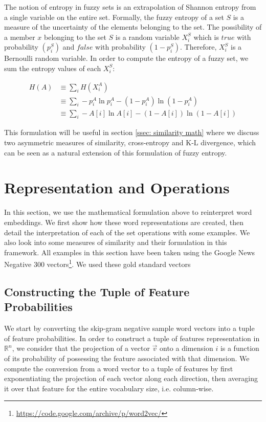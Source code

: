 \documentclass{book}
\begin{document}
The notion of entropy in fuzzy sets is an extrapolation of Shannon entropy from
a single variable on the entire set. Formally, the fuzzy entropy of a set $S$
is a measure of the uncertainty of the elements belonging to the set. The
possibility of a member $x$ belonging to the set $S$ is a random variable
$X_i^S$ which is $true$ with probability $(p_i^S)$ and $false$ with probability
$(1-p^S_i)$. Therefore, $X_i^S$ is a Bernoulli random variable. In order to
compute the entropy of a fuzzy set, we sum the entropy values of each $X_i^S$:

{\footnotesize \begin{align*} H(A) &\equiv \sum_i H(X^A_i) \\ &\equiv \sum_i
-p_i^A \ln p_i^A - (1 - p_i^A) \ln (1 - p_i^A) \\ &\equiv  \sum_i -A[i] \ln
A[i] - (1 - A[i]) \ln (1 - A[i]) \end{align*} }

This formulation will be useful in section \ref{ssec: similarity math} where we
discuss two asymmetric measures of similarity, cross-entropy and K-L
divergence, which can be seen as a natural extension of this formulation of
fuzzy entropy.

\section{Representation and Operations} \label{sec: meat of the paper}

In this section, we use the mathematical formulation above to reinterpret word
embeddings. We first show how these word representations are created, then
detail the interpretation of each of the set operations with some examples. We
also look into some measures of similarity and their formulation in this
framework. All examples in this section have been taken using the Google News
Negative 300
vectors\footnote{\url{https://code.google.com/archive/p/word2vec/}}. We used
these gold standard vectors 

\subsection{Constructing the Tuple of Feature Probabilities} \label{ssec:
constructing}

We start by converting the skip-gram negative sample word vectors into a tuple
of feature probabilities. In order to construct a tuple of features
representation in $\mathbb{R}^n$, we consider that the projection of a vector
$\vec v$ onto a dimension $i$ is a function of its probability of possessing
the feature associated with that dimension.  We compute the conversion from a
word vector to a tuple of features by first exponentiating the projection of
each vector along each direction, then averaging it over that feature for the
entire vocabulary size, i.e. column-wise.
\end{document}

